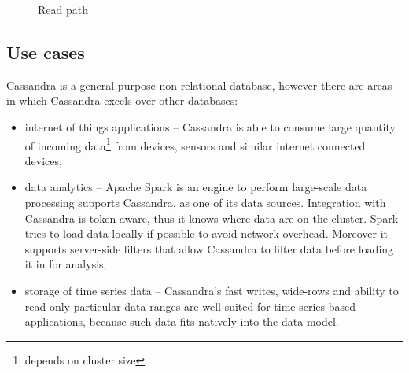 \begin{figure}[H]
\caption{Read path}
  \label{fig:readPath}
\end{figure}
 
\subsection{Use cases}
Cassandra is a general purpose non-relational database, however there are areas in which Cassandra excels over other databases:
\begin{itemize}
\item internet of things applications -- Cassandra is able to consume large quantity of incoming data\footnote{depends on cluster size} from devices, sensors and similar internet connected devices,
\item data analytics -- Apache Spark is an engine to perform large-scale data processing \cite{ApacheSpark} supports Cassandra, as one of its data sources.
Integration with Cassandra is token aware, thus it knows where data are on the cluster. Spark tries to load data locally if possible to avoid network overhead. Moreover it supports server-side filters that allow Cassandra to filter data before loading it in for analysis,
\item storage of time series data -- Cassandra's fast writes, wide-rows and ability to read only particular data ranges are well suited for time series based applications, because such data fits natively into the data model.
\end{itemize} 

